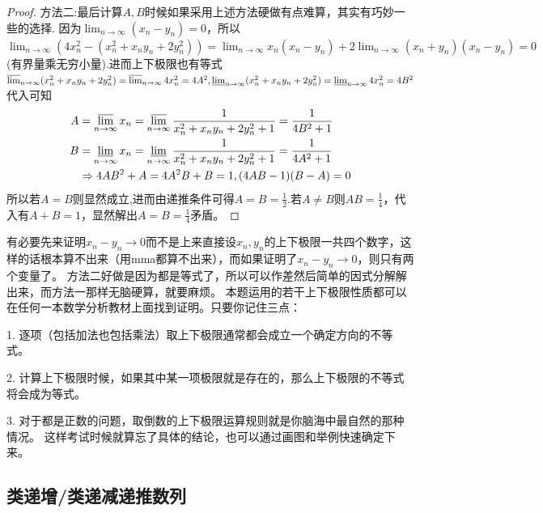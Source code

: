 \documentclass[../../main.tex]{subfiles}%
\begin{document}
\begin{proof}
{\color{blue}方法二:}最后计算\(A,B\)时候如果采用上述方法硬做有点难算，其实有巧妙一些的选择.
因为\(\lim_{n\rightarrow\infty}(x_n - y_n)=0\)，所以\(\lim_{n\rightarrow \infty} (4x_{n}^{2}-(x_{n}^{2}+x_ny_n+2y_{n}^{2}))=\lim_{n\rightarrow \infty} x_n\left( x_n-y_n \right) +2\lim_{n\rightarrow \infty} \left( x_n+y_n \right) \left( x_n-y_n \right) =0\)(有界量乘无穷小量).进而上下极限也有等式
\(\varlimsup_{n\rightarrow\infty}(x_n^2 + x_ny_n + 2y_n^2)=\varlimsup_{n\rightarrow\infty}4x_n^2 = 4A^2,\varliminf_{n\rightarrow\infty}(x_n^2 + x_ny_n + 2y_n^2)=\varliminf_{n\rightarrow\infty}4x_n^2 = 4B^2\)
代入可知
\begin{align*}
A&=\varlimsup_{n\rightarrow\infty}x_n=\varlimsup_{n\rightarrow\infty}\frac{1}{x_n^2 + x_ny_n + 2y_n^2 + 1}=\frac{1}{4B^2 + 1}\\
B&=\varliminf_{n\rightarrow\infty}x_n=\varliminf_{n\rightarrow\infty}\frac{1}{x_n^2 + x_ny_n + 2y_n^2 + 1}=\frac{1}{4A^2 + 1}\\
&\Rightarrow 4AB^2+A = 4A^2B + B = 1,(4AB - 1)(B - A)=0
\end{align*}
所以若\(A = B\)则显然成立,进而由递推条件可得$A=B=\frac{1}{2}$.若\(A\neq B\)则\(AB=\frac{1}{4}\)，代入有\(A + B = 1\)，显然解出\(A = B=\frac{1}{4}\)矛盾。
\end{proof}
\begin{remark}
有必要先来证明\(x_n - y_n\rightarrow0\)而不是上来直接设\(x_n,y_n\)的上下极限一共四个数字，这样的话根本算不出来（用mma都算不出来），而如果证明了\(x_n - y_n\rightarrow0\)，则只有两个变量了。
方法二好做是因为都是等式了，所以可以作差然后简单的因式分解解出来，而方法一那样无脑硬算，就要麻烦。
本题运用的若干上下极限性质都可以在任何一本数学分析教材上面找到证明。只要你记住三点：

1. 逐项（包括加法也包括乘法）取上下极限通常都会成立一个确定方向的不等式。

2. 计算上下极限时候，如果其中某一项极限就是存在的，那么上下极限的不等式将会成为等式。

3. 对于都是正数的问题，取倒数的上下极限运算规则就是你脑海中最自然的那种情况。
这样考试时候就算忘了具体的结论，也可以通过画图和举例快速确定下来。
\end{remark}




\subsection{类递增/类递减递推数列}
\end{document}
